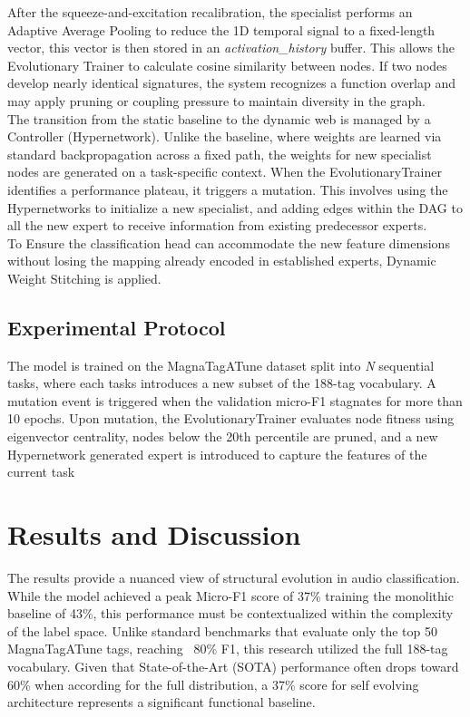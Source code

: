 \documentclass{article}
\begin{document}
\noindent After the squeeze-and-excitation recalibration, the specialist performs an Adaptive Average Pooling to reduce the 1D temporal signal to a fixed-length vector, this vector is then stored in an \textit{activation\_history} buffer. This allows the Evolutionary Trainer to calculate cosine similarity between nodes. If two nodes develop nearly identical signatures, the system recognizes a function overlap and may apply pruning or coupling pressure to maintain diversity in the graph.\\

\noindent The transition from the static baseline to the dynamic web is managed by a Controller (Hypernetwork). Unlike the baseline, where weights are learned via standard backpropagation across a fixed path, the weights for new specialist nodes are generated on a task-specific context. When the EvolutionaryTrainer identifies a performance plateau, it triggers a mutation. This involves using the Hypernetworks to initialize a new specialist, and adding edges within the DAG to all the new expert to receive information from existing predecessor experts.\\

\noindent To Ensure the classification head can accommodate the new feature dimensions without losing the mapping already encoded in established experts, Dynamic Weight Stitching is applied.

\subsection{Experimental Protocol}
The model is trained on the MagnaTagATune dataset split into \textit{N} sequential tasks, where each tasks introduces a new subset of the 188-tag vocabulary. A mutation event is triggered when the validation micro-F1 stagnates for more than 10 epochs. Upon mutation, the EvolutionaryTrainer evaluates node fitness using eigenvector centrality, nodes below the 20th percentile are pruned, and a new Hypernetwork generated expert is introduced to capture the features of the current task


\section{Results and Discussion}
The results provide a nuanced view of structural evolution in audio classification. While the model achieved a peak Micro-F1 score of 37\% training the monolithic baseline of 43\%, this performance must be contextualized within the complexity of the label space. Unlike standard benchmarks that evaluate only the top 50 MagnaTagATune tags, reaching ~80\% F1, this research utilized the full 188-tag vocabulary. Given that State-of-the-Art (SOTA) performance often drops toward 60\% when according for the full distribution, a 37\% score for self evolving architecture represents a significant functional baseline.
\end{document}
